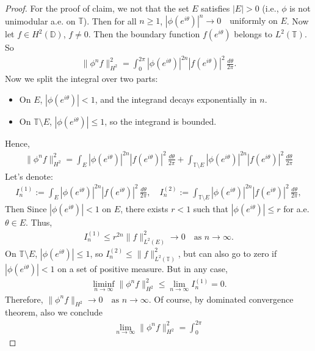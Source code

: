 \documentclass[12pt,titlepage]{amsart}
\theoremstyle{definition}
\theoremstyle{remark}
\begin{document}
\begin{proof}
For the proof of claim, we not that the set $E$ satisfies $|E| >
0$ (i.e., $\phi$ is not unimodular a.e. on $\mathbb{T}$). Then for
all $n \geq 1$, $|\phi(e^{i\theta})|^n \to 0 \quad \text{uniformly
on } E$. Now let $f \in H^2(\mathbb{D})$, $f \neq 0$. Then the
boundary function $f(e^{i\theta})$ belongs to $L^2(\mathbb{T})$.
So
\begin{eqnarray*}
\|\phi^n f\|_{H^2}^2 = \int_0^{2\pi} |\phi(e^{i\theta})|^{2n}
|f(e^{i\theta})|^2 \, \frac{d\theta}{2\pi}.
\end{eqnarray*}
Now we split the integral over two parts:
\begin{itemize}
\item[(i)] On $E$, $|\phi(e^{i\theta})| < 1$, and the integrand
decays exponentially in $n$. \item[(ii)] On $\mathbb{T} \setminus
E$, $|\phi(e^{i\theta})| \leq 1$, so the integrand is bounded.
\end{itemize}
  Hence,
\begin{eqnarray*}
\|\phi^n f\|_{H^2}^2 = \int_E |\phi(e^{i\theta})|^{2n}
|f(e^{i\theta})|^2 \, \frac{d\theta}{2\pi} + \int_{\mathbb{T}
\setminus E} |\phi(e^{i\theta})|^{2n} |f(e^{i\theta})|^2 \,
\frac{d\theta}{2\pi}
\end{eqnarray*}
Let's denote:
\begin{eqnarray*}
I_n^{(1)} := \int_E |\phi(e^{i\theta})|^{2n} |f(e^{i\theta})|^2 \,
\frac{d\theta}{2\pi}, \quad I_n^{(2)} := \int_{\mathbb{T}
\setminus E} |\phi(e^{i\theta})|^{2n} |f(e^{i\theta})|^2 \,
\frac{d\theta}{2\pi},
\end{eqnarray*}
Then Since $|\phi(e^{i\theta})| < 1$ on $E$, there exists $r < 1$
such that $|\phi(e^{i\theta})| \leq r$ for a.e. $\theta \in E$.
Thus,
\begin{eqnarray*}
I_n^{(1)} \leq r^{2n} \|f\|_{L^2(E)}^2 \to 0 \quad \text{as } n
\to \infty.
\end{eqnarray*}
On $\mathbb{T} \setminus E$, $|\phi(e^{i\theta})| \leq 1$, so
$I_n^{(2)} \leq \|f\|_{L^2(\mathbb{T})}^2$, but can also go to
zero if $|\phi(e^{i\theta})| < 1$ on a set of positive measure.
But in any case,
\begin{eqnarray*}
\liminf_{n \to \infty} \|\phi^n f\|_{H^2}^2 \leq \lim_{n \to
\infty} I_n^{(1)} = 0.
\end{eqnarray*}
Therefore, $\|\phi^n f\|_{H^2} \to 0 \quad \text{as } n \to
\infty$. Of course, by dominated convergence theorem, also we
conclude
\begin{eqnarray*}
\lim_{n\rightarrow\infty}\|\phi^n f\|_{H^2}^2 = \int_0^{2\pi}

\end{eqnarray*}
\end{proof}
\end{document}
